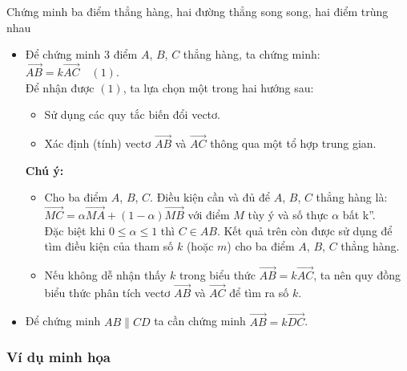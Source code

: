 \begin{dang}{Chứng minh ba điểm thẳng hàng, hai đường thẳng song song, hai điểm trùng nhau}%
	\begin{itemize}
		\item Để chứng minh $3$ điểm $A$, $B$, $C$ thẳng hàng, ta chứng minh: $\overrightarrow{AB}=k\overrightarrow{AC} \quad (1)$.\\
		      Để nhận được $(1)$, ta lựa chọn một trong hai hướng sau:
		      \begin{itemize}
			      \item Sử dụng các quy tắc biến đổi vectơ.
			      \item Xác định (tính) vectơ $\overrightarrow{AB}$ và $\overrightarrow{AC}$ thông qua một tổ hợp trung gian.
		      \end{itemize}
		      \textbf{Chú ý:}
		      \begin{itemize}
			      \item Cho ba điểm $A$, $B$, $C$. Điều kiện cần và đủ để $A$, $B$, $C$ thẳng hàng là: $\overrightarrow{MC}=\alpha \overrightarrow{MA}+(1-\alpha) \overrightarrow{MB}$ với điểm $M$ tùy ý và số thực $\alpha$ bất k''. \\
			            Đặc biệt khi $0 \le \alpha \le 1$ thì $C \in AB$. Kết quả trên còn được sử dụng để tìm điều kiện của tham số $k$ (hoặc $m$) cho ba điểm $A$, $B$, $C$ thẳng hàng.
			      \item Nếu không dễ nhận thấy $k$ trong biểu thức $\overrightarrow{AB}=k \overrightarrow{AC}$, ta nên quy đồng biểu thức phân tích vectơ $\overrightarrow{AB}$ và $\overrightarrow{AC}$ để tìm ra số $k$.
		      \end{itemize}
		\item Để chứng minh $AB \parallel CD$ ta cần chứng minh $\overrightarrow{AB}=k \overrightarrow{DC}$.
	\end{itemize}
\end{dang}

\subsubsection{Ví dụ minh họa}

